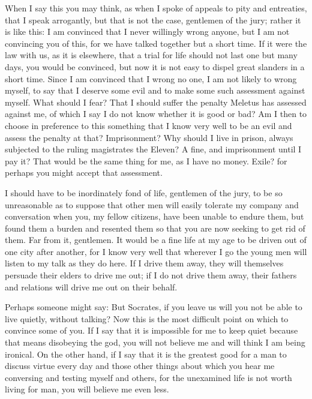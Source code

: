 When I say this you may think, as when I spoke of appeals to pity and entreaties, that I speak
arrogantly, but that is not the case, gentlemen of the jury; rather it is like this: I am convinced that
I never willingly wrong anyone, but I am not convincing you of this, for we have talked together
but a short time. If it were the law with us, as it is elsewhere, that a trial for life should not last one
but many days, you would be convinced, but now it is not easy to dispel great slanders in a short
time. Since I am convinced that I wrong no one, I am not likely to wrong myself, to say that I
deserve some evil and to make some such assessment against myself. What should I fear? That I
should suffer the penalty Meletus has assessed against me, of which I say I do not know whether
it is good or bad? Am I then to choose in preference to this something that I know very well to be
an evil and assess the penalty at that? Imprisonment? Why should I live in prison, always subjected
to the ruling magistrates the Eleven? A fine, and imprisonment until I pay it? That would be the
same thing for me, as I have no money. Exile? for perhaps you might accept that assessment.

I should have to be inordinately fond of life, gentlemen of the jury, to be so unreasonable as
to suppose that other men will easily tolerate my company and conversation when you, my fellow
citizens, have been unable to endure them, but found them a burden and resented them so that you
are now seeking to get rid of them. Far from it, gentlemen. It would be a fine life at my age to be
driven out of one city after another, for I know very well that wherever I go the young men will
listen to my talk as they do here. If I drive them away, they will themselves persuade their elders
to drive me out; if I do not drive them away, their fathers and relations will drive me out on their
behalf.

Perhaps someone might say: But Socrates, if you leave us will you not be able to live quietly,
without talking? Now this is the most difficult point on which to convince some of you. If I say
that it is impossible for me to keep quiet because that means disobeying the god, you will not
believe me and will think I am being ironical. On the other hand, if I say that it is the greatest good
for a man to discuss virtue every day and those other things about which you hear me conversing
and testing myself and others, for the unexamined life is not worth living for man, you will believe
me even less.

